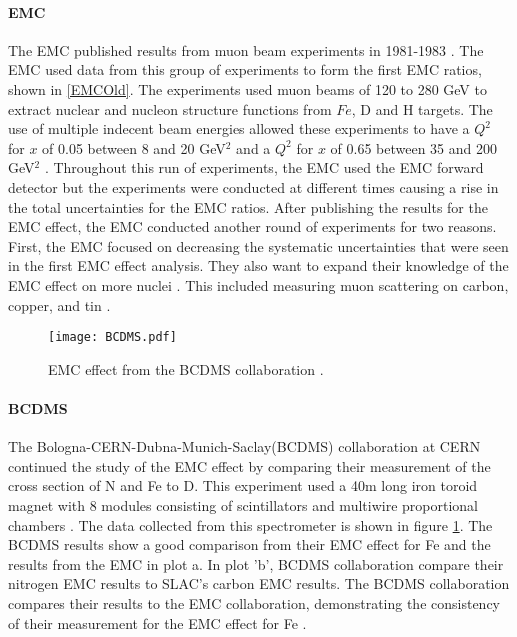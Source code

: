 \paragraph{EMC} The EMC published results from muon beam experiments in 1981-1983 \cite{EMC_iron,EM,EMC_F2d,CERN_EMC}.  The EMC used data from this group of experiments to form the first EMC ratios, shown in \ref{EMCOld}. The experiments used muon beams of 120 to 280 GeV to extract nuclear and nucleon structure functions from $Fe$, D and H targets. The use of multiple indecent beam energies allowed these experiments to have a $Q^2$ for $x$ of 0.05 between 8 and 20 GeV$^2$ and a $Q^2$ for $x$ of 0.65 between 35 and 200 GeV$^2$ \cite{CERN_EMC}. Throughout this run of experiments, the EMC used the EMC forward detector but the experiments were conducted at different times causing a rise in the total uncertainties for the EMC ratios\cite{EM}. After publishing the results for the EMC effect, the EMC conducted another round of experiments for two reasons. First, the EMC focused on decreasing the systematic uncertainties that were seen in the first EMC effect analysis. They also want to expand their knowledge of the EMC effect on more nuclei \cite{EMC_ext, Ajth}. This included measuring muon scattering on carbon, copper, and tin \cite{EMC_ext}.

\begin{figure}[t]
	\centering
	\texttt{[image: BCDMS.pdf]}
		\caption{EMC effect from the BCDMS collaboration \cite{BCDMS}. }
	\label{fig:BCDMS}
\end{figure}
\paragraph{BCDMS}The Bologna-CERN-Dubna-Munich-Saclay(BCDMS) collaboration at CERN continued the study of the EMC effect by comparing their measurement of the cross section of N and Fe to D. This experiment used a 40m long iron toroid magnet with 8 modules consisting of scintillators and multiwire proportional chambers \cite{BCDMS}. The data collected from this spectrometer is shown in figure \ref{fig:BCDMS}. The BCDMS results show a good comparison from their EMC effect for Fe and the results from the EMC in plot a. In plot 'b', BCDMS collaboration compare their nitrogen EMC results to SLAC's carbon EMC results. The BCDMS collaboration compares their results to the EMC collaboration, demonstrating the consistency of their measurement for the EMC effect for Fe \cite{BCDMS,Norton}.

